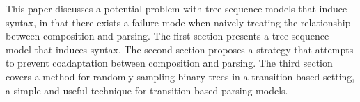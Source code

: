 This paper discusses a potential problem with tree-sequence models that induce syntax, in that there exists a failure mode when naively treating the relationship between composition and parsing. The first section presents a tree-sequence model that induces syntax. The second section proposes a strategy that attempts to prevent coadaptation between composition and parsing. The third section covers a method for randomly sampling binary trees in a transition-based setting, a simple and useful technique for transition-based parsing models.
